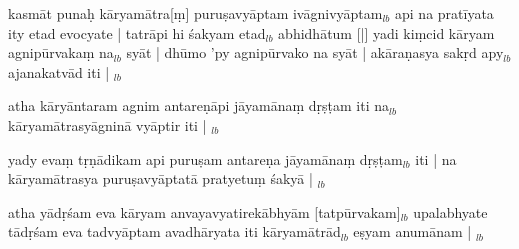 \documentclass[article,12pt,a4paper]{memoir}%
\newcounter{parCount}
\begin{document}
	  
	  \pstart \leavevmode%
	kasmāt punaḥ kāryamātra[ṃ] puruṣavyāptam ivāgnivyāptam{\tiny $_{lb}$} api na pratīyata ity etad evocyate | tatrāpi hi śakyam etad{\tiny $_{lb}$} abhidhātum [|] yadi kiṃcid kāryam agnipūrva\leavevmode{}kaṃ na{\tiny $_{lb}$} syāt | dhūmo 'py agnipūrvako na syāt | akāraṇasya sakṛd apy{\tiny $_{lb}$} ajanakatvād iti |
	{}
	\pend%
      {\tiny $_{lb}$}

	  
	  \pstart \leavevmode%
	atha kāryāntaram agnim antareṇāpi jāyamānaṃ dṛṣṭam iti na{\tiny $_{lb}$} kāryamātrasyāgninā vyāptir iti |
	{}
	\pend%
      {\tiny $_{lb}$}

	  
	  \pstart \leavevmode%
	yady evaṃ tṛṇādikam api puruṣam antareṇa jāyamānaṃ dṛṣṭam{\tiny $_{lb}$} iti | na kāryamātrasya puruṣavyāptatā pratyetuṃ śakyā |
	{}
	\pend%
      {\tiny $_{lb}$}

	  
	  \pstart \leavevmode%
	atha yādṛśam eva kāryam anvayavyatirekābhyām [tatpūrvakam]{\tiny $_{lb}$} upalabhyate tādṛśam eva tadvyāptam avadhāryata iti kāryamātrād{\tiny $_{lb}$} eṣyam anumānam |
	{}
	\pend%
      {\tiny $_{lb}$}
\end{document}
